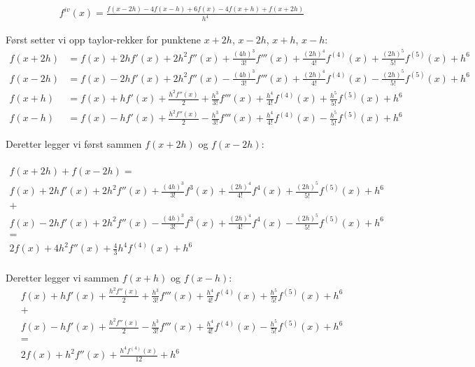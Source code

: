 \begin{align}
    f^{iv}(x)=\frac{f(x-2h)-4f(x-h)+6f(x)-4f(x+h)+f(x+2h)}{h^4}\nonumber
\end{align}

Først setter vi opp taylor-rekker for punktene $x+2h$, $x-2h$, $x+h$, $x-h$: 
\begin{align}
    f(x+2h)&=f(x)+2hf'(x)+2h^2f''(x)+\frac{(4h)^3}{3!}f'''(x)+\frac{(2h)^4}{4!}f^{(4)}(x)+\frac{(2h)^5}{5!}f^{(5)}(x)+h^6\nonumber\\ 
    f(x-2h)&=f(x)-2hf'(x)+2h^2f''(x)-\frac{(4h)^3}{3!}f'''(x)+\frac{(2h)^4}{4!}f^{(4)}(x)-\frac{(2h)^5}{5!}f^{(5)}(x)+h^6\nonumber\\
    f(x+h)&=f(x)+hf'(x)+\frac{h^2f''(x)}{2}+\frac{h^3}{3!}f'''(x)+\frac{h^4}{4!}f^{(4)}(x)+\frac{h^5}{5!}f^{(5)}(x)+h^6\nonumber\\
    f(x-h)&=f(x)-hf'(x)+\frac{h^2f''(x)}{2}-\frac{h^3}{3!}f'''(x)+\frac{h^4}{4!}f^{(4)}(x)-\frac{h^5}{5!}f^{(5)}(x)+h^6\nonumber
\end{align}

Deretter legger vi først sammen $f(x+2h)$ og $f(x-2h)$: 

\begin{multline}
    \\
    f(x+2h)+f(x-2h)= \\
    f(x)+2hf'(x)+2h^2f''(x)+\frac{(4h)^3}{3!}f^3(x)+\frac{(2h)^4}{4!}f^{4}(x)+\frac{(2h)^5}{5!}f^{(5)}(x)+h^6 \\
    + \\
  	f(x)-2hf'(x)+2h^2f''(x)-\frac{(4h)^3}{3!}f^3(x)+\frac{(2h)^4}{4!}f^{4}(x)-\frac{(2h)^5}{5!}f^{(5)}(x)+h^6\nonumber \\
  	=\\
  	2f(x)+4h^2f''(x)+\frac{4}{3}h^4f^{(4)}(x)+h^6 \nonumber\\
\end{multline}

Deretter legger vi sammen $f(x+h)$ og $f(x-h)$: 
\begin{multline}
	f(x)+hf'(x)+\frac{h^2f''(x)}{2}+\frac{h^3}{3!}f'''(x)+\frac{h^4}{4!}f^{(4)}(x)+\frac{h^5}{5!}f^{(5)}(x)+h^6\\
	+\\
	f(x)-hf'(x)+\frac{h^2f''(x)}{2}-\frac{h^3}{3!}f'''(x)+\frac{h^4}{4!}f^{(4)}(x)-\frac{h^5}{5!}f^{(5)}(x)+h^6\\
	=\\
	2f(x)+h^2f''(x)+\frac{h^4f^{(4)}(x)}{12} + h^6 \nonumber \\
\end{multline}

